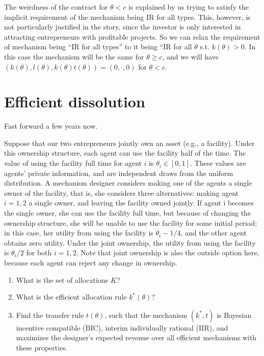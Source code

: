\documentclass[a4paper]{article}
\begin{document}
\begin{enumerate}
		The weirdness of the contract for $\theta < c$ is explained by us trying to satisfy the implicit requirement of the mechanism being IR for all types. This, however, is not particularly justified in the story, since the investor is only interested in attracting entrepreneurs with profitable projects. So we can relax the requirement of mechanism being ``IR for all types'' to it being ``IR for all $\theta$ s.t. $k(\theta)>0$. In this case the mechanism will be the same for $\theta \geq c$, and we will have $(k(\theta),l(\theta),k(\theta)t(\theta)) = (0,\cdot,0)$ for $\theta < c$.
	\end{enumerate}
\fi

	
	
	
\section{Efficient dissolution}
	
	Fast forward a few years now.
	
	Suppose that our two entrepreneurs jointly own an asset (e.g., a facility). Under this ownership structure, each agent can use the facility half of the time. The value of using the facility full time for agent $i$ is $\theta_i \in [0, 1]$. These values are agents’ private information, and are independent draws from the uniform distribution. A mechanism designer considers making one of the	agents a single owner of the facility, that is, she considers three alternatives: making agent $i = 1, 2$ a single owner, and leaving the facility owned jointly. If agent i becomes the single owner, she can use the facility full time, but because of changing the ownership structure, she will be unable to use the facility for some initial period; in this case, her utility from using the facility is $\theta_i - 1/4$, and the other agent obtains zero utility. Under the joint ownership, the utility from using the facility is $\theta_i/2$ for both $i = 1,2$. Note that joint ownership is also the outside option here, because each agent can reject any change in ownership.
	
	\begin{enumerate}
		\item What is the set of allocations $K$?
		\item What is the efficient allocation rule $k^*(\theta)$?
		\item Find the transfer rule $t(\theta)$, such that the mechanism $(k^*,t)$ is Bayesian incentive compatible (BIC), interim individually rational (IIR), and maximizes the designer’s expected revenue over all efficient mechanisms with these properties.
	\end{enumerate}
	
\end{document}
